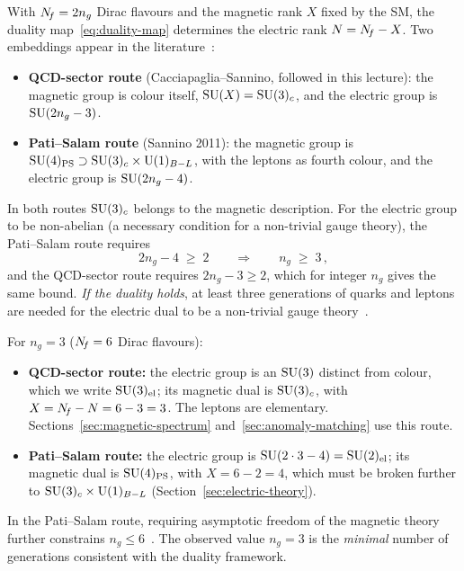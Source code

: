 \documentclass[11pt,a4paper]{article}
\begin{document}
With $N_{\!f} = 2n_g$ Dirac flavours and the magnetic rank $X$ fixed by the
SM, the duality map~\eqref{eq:duality-map} determines the electric rank
$N = N_{\!f} - X$.  Two embeddings appear in the
literature~\cite{Sannino2011,CacciapagliaSannino2024}:
\begin{itemize}
  \item \textbf{QCD-sector route} (Cacciapaglia--Sannino, followed in
    this lecture): the magnetic group is colour itself,
    $\mathrm{SU}(X) = \mathrm{SU}(3)_c$, and the electric group is $\mathrm{SU}(2n_g - 3)$.
  \item \textbf{Pati--Salam route} (Sannino 2011): the magnetic group is
    $\mathrm{SU}(4)_{\mathrm{PS}} \supset \mathrm{SU}(3)_c \times \mathrm{U}(1)_{B-L}$, with the
    leptons as fourth colour, and the electric group is
    $\mathrm{SU}(2n_g - 4)$.
\end{itemize}
In both routes $\mathrm{SU}(3)_c$ belongs to the magnetic description.  For the
electric group to be non-abelian (a necessary condition for a
non-trivial gauge theory), the Pati--Salam route requires
\begin{equation}\label{eq:gen-bound}
  2n_g - 4 \;\geq\; 2
  \qquad \Longrightarrow \qquad
  \boxed{n_g \;\geq\; 3\,,}
\end{equation}
and the QCD-sector route requires $2n_g - 3 \geq 2$, which for integer
$n_g$ gives the same bound.  \emph{If the duality holds}, at least
three generations of quarks and leptons are needed for the electric dual
to be a non-trivial gauge theory~\cite{Sannino2011,CacciapagliaSannino2024}.

For $n_g = 3$ ($N_{\!f} = 6$ Dirac flavours):
\begin{itemize}
  \item \textbf{QCD-sector route:} the electric group is an $\mathrm{SU}(3)$
    distinct from colour, which we write $\mathrm{SU}(3)_{\mathrm{el}}$; its
    magnetic dual is $\mathrm{SU}(3)_c$, with $X = N_{\!f} - N = 6 - 3 = 3$.  The
    leptons are elementary.  Sections~\ref{sec:magnetic-spectrum}
    and~\ref{sec:anomaly-matching} use this route.
  \item \textbf{Pati--Salam route:} the electric group is
    $\mathrm{SU}(2 \cdot 3 - 4) = \mathrm{SU}(2)_{\mathrm{el}}$; its magnetic dual is
    $\mathrm{SU}(4)_{\mathrm{PS}}$, with $X = 6 - 2 = 4$, which must be broken
    further to $\mathrm{SU}(3)_c \times \mathrm{U}(1)_{B-L}$
    (Section~\ref{sec:electric-theory}).
\end{itemize}

\begin{remark}
  In the Pati--Salam route, requiring asymptotic freedom of the magnetic
  theory further constrains $n_g \leq 6$~\cite{Sannino2011}.  The
  observed value $n_g = 3$ is the \emph{minimal} number of generations
  consistent with the duality framework.
\end{remark}
\end{document}
